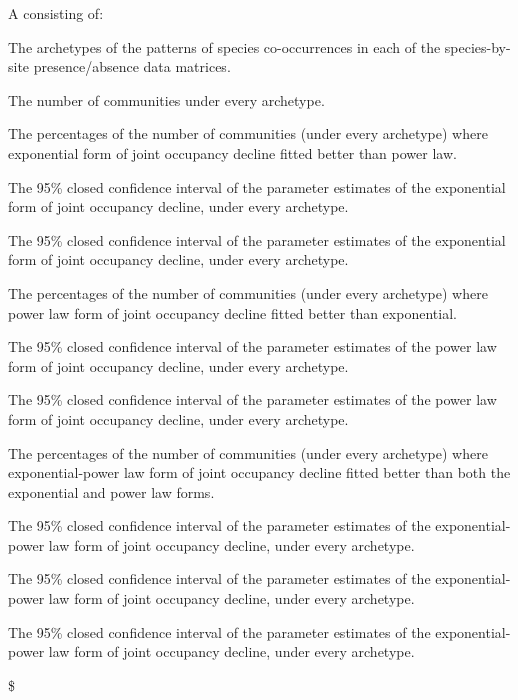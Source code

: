 \documentclass[a4paper]{book}
\begin{document}
\begin{Value}
A  consisting of:
\begin{ldescription}
\item[\code{\code{arch}}] The archetypes of the patterns of species co-occurrences in each of the  species-by-site
presence/absence  data matrices.
\item[\code{\code{n}}] The number of communities under every archetype.
\item[\code{\AsIs{ex\_\%}}] The percentages of the number of communities (under every archetype) where
exponential form of joint occupancy decline fitted better than power law.
\item[\code{\code{a.ex}}] The 95\% closed confidence interval of the  parameter estimates of the exponential
form of joint occupancy decline, under every archetype.
\item[\code{\code{b.ex}}] The 95\% closed confidence interval of the  parameter estimates of the exponential
form of joint occupancy decline, under every archetype.
\item[\code{\AsIs{p.l\_\%}}] The percentages of the number of communities (under every archetype) where
power law form of joint occupancy decline fitted better than exponential.
\item[\code{\code{a.pl}}] The 95\% closed confidence interval of the  parameter estimates of the power law
form of joint occupancy decline, under every archetype.
\item[\code{\code{b.pl}}] The 95\% closed confidence interval of the  parameter estimates of the power law
form of joint occupancy decline, under every archetype.
\item[\code{\AsIs{ex.pl\_\%}}] The percentages of the number of communities (under every archetype) where exponential-power
law form of joint occupancy decline fitted better than both the exponential and power law forms.
\item[\code{\code{a.expl}}] The 95\% closed confidence interval of the  parameter estimates of the exponential-power law
form of joint occupancy decline, under every archetype.
\item[\code{\code{b.expl}}] The 95\% closed confidence interval of the  parameter estimates of the exponential-power law
form of joint occupancy decline, under every archetype.
\item[\code{\code{c.expl}}] The 95\% closed confidence interval of the  parameter estimates of the exponential-power law
form of joint occupancy decline, under every archetype.
\end{ldescription}
\$


\end{Value}
\end{document}
